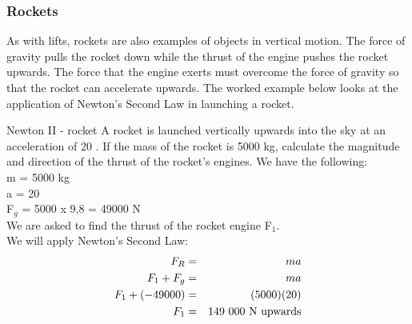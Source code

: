 \subsubsection{Rockets}
As with lifts, rockets are also examples of objects in vertical motion. The force of gravity pulls the rocket down while the thrust of the engine pushes the rocket upwards. The force that the engine exerts must overcome the force of gravity so that the rocket can accelerate upwards. The worked example below looks at the application of Newton's Second Law in launching a rocket. 

\begin{wex}{Newton II - rocket}
{A rocket is launched vertically upwards into the sky at an acceleration of 20 \mss. If the mass of the rocket is 5000 kg, calculate the magnitude and direction of the thrust of the rocket's engines.
}
{
We have the following:\\
m = 5000 kg\\
a = 20 \mss\\
F$_{g}$ = 5000 x 9,8 = 49000 N\\
We are asked to find the thrust of the rocket engine F$_{1}$.\\

We will apply Newton's Second Law:
\begin{eqnarray*}
F_{R} &=& ma\\
F_{1}+ F_{g} &=& ma\\
F_{1} + (-49000) &=& (5000)(20)\\
F_{1} &=& 149~000~\rm{N~upwards}\\
\end{eqnarray*}
}
\end{wex}

